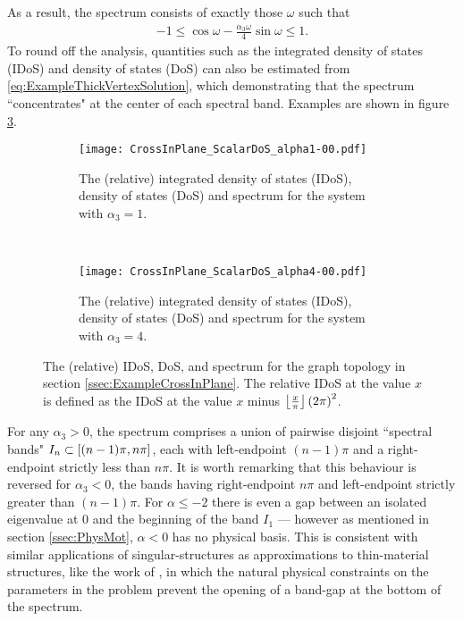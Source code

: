 As a result, the spectrum consists of exactly those $\omega$ such that
\begin{align*}
	-1 \leq \cos\omega - \frac{\alpha_3\omega}{4}\sin\omega \leq 1.
\end{align*}
To round off the analysis, quantities such as the integrated density of states (IDoS) and density of states (DoS) can also be estimated from \eqref{eq:ExampleThickVertexSolution}, which demonstrating that the spectrum ``concentrates" at the center of each spectral band.
Examples are shown in figure \ref{fig:CrossInPlane_ScalarDoS}.
\begin{figure}[t!]
	\begin{subfigure}[t]{0.45\textwidth}
		\centering
		\texttt{[image: CrossInPlane\_ScalarDoS\_alpha1-00.pdf]}
		\caption{\label{fig:CrossInPlane_ScalarDoS_alpha1-00} The (relative) integrated density of states (IDoS), density of states (DoS) and spectrum for the system with $\alpha_3=1$.}
	\end{subfigure}
	~
	\begin{subfigure}[t]{0.45\textwidth}
		\centering
		\texttt{[image: CrossInPlane\_ScalarDoS\_alpha4-00.pdf]}
		\caption{\label{fig:CrossInPlane_ScalarDoS_alpha4-00} The (relative) integrated density of states (IDoS), density of states (DoS) and spectrum for the system with $\alpha_3=4$.}
	\end{subfigure}	
	\caption{\label{fig:CrossInPlane_ScalarDoS} The (relative) IDoS, DoS, and spectrum for the graph topology in section \ref{ssec:ExampleCrossInPlane}.
	The relative IDoS at the value $x$ is defined as the IDoS at the value $x$ minus $\left\lfloor\frac{x}{\pi}\right\rfloor\left( 2\pi \right)^2$.}
\end{figure}
For any $\alpha_3>0$, the spectrum comprises a union of pairwise disjoint ``spectral bands" $I_n\subset\left[ (n-1)\pi, n\pi \right]$, each with left-endpoint $(n-1)\pi$ and a right-endpoint strictly less than $n\pi$.
It is worth remarking that this behaviour is reversed for $\alpha_3<0$, the bands having right-endpoint $n\pi$ and left-endpoint strictly greater than $(n-1)\pi$.
For $\alpha\leq-2$ there is even a gap between an isolated eigenvalue at $0$ and the beginning of the band $I_1$ --- however as mentioned in section \ref{ssec:PhysMot}, $\alpha<0$ has no physical basis.
This is consistent with similar applications of singular-structures as approximations to thin-material structures, like the work of \cite{cherednichenko2019time}, in which the natural physical constraints on the parameters in the problem prevent the opening of a band-gap at the bottom of the spectrum.
